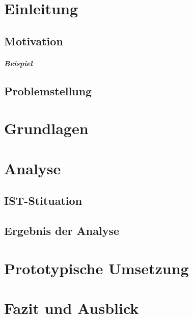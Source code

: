 \chapter{Einleitung}

\section{Motivation}

\paragraph{Beispiel}

\section{Problemstellung}

\chapter{Grundlagen}

\chapter{Analyse}

\section{IST-Stituation}

\section{Ergebnis der Analyse}

\chapter{Prototypische Umsetzung}

\chapter{Fazit und Ausblick}
